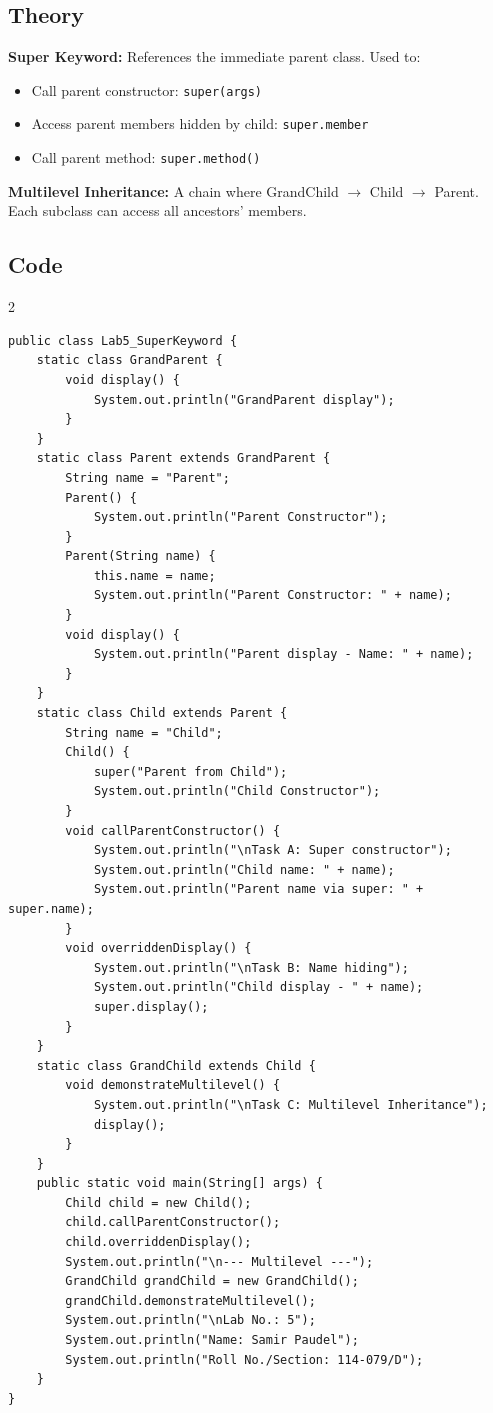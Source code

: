 \documentclass[10pt,a4paper]{article}
\begin{document}
\subsection*{Theory}
\textbf{Super Keyword:} References the immediate parent class. Used to:
\begin{itemize}[nosep]
    \item Call parent constructor: \texttt{super(args)}
    \item Access parent members hidden by child: \texttt{super.member}
    \item Call parent method: \texttt{super.method()}
\end{itemize}
\textbf{Multilevel Inheritance:} A chain where GrandChild $\rightarrow$ Child $\rightarrow$ Parent. Each subclass can access all ancestors' members.

\subsection*{Code}
\begin{multicols}{2}
\begin{lstlisting}
public class Lab5_SuperKeyword {
    static class GrandParent {
        void display() {
            System.out.println("GrandParent display");
        }
    }
    static class Parent extends GrandParent {
        String name = "Parent";
        Parent() {
            System.out.println("Parent Constructor");
        }
        Parent(String name) {
            this.name = name;
            System.out.println("Parent Constructor: " + name);
        }
        void display() {
            System.out.println("Parent display - Name: " + name);
        }
    }
    static class Child extends Parent {
        String name = "Child";
        Child() {
            super("Parent from Child");
            System.out.println("Child Constructor");
        }
        void callParentConstructor() {
            System.out.println("\nTask A: Super constructor");
            System.out.println("Child name: " + name);
            System.out.println("Parent name via super: " + super.name);
        }
        void overriddenDisplay() {
            System.out.println("\nTask B: Name hiding");
            System.out.println("Child display - " + name);
            super.display();
        }
    }
    static class GrandChild extends Child {
        void demonstrateMultilevel() {
            System.out.println("\nTask C: Multilevel Inheritance");
            display();
        }
    }
    public static void main(String[] args) {
        Child child = new Child();
        child.callParentConstructor();
        child.overriddenDisplay();
        System.out.println("\n--- Multilevel ---");
        GrandChild grandChild = new GrandChild();
        grandChild.demonstrateMultilevel();
        System.out.println("\nLab No.: 5");
        System.out.println("Name: Samir Paudel");
        System.out.println("Roll No./Section: 114-079/D");
    }
}
\end{lstlisting}
\end{multicols}
\end{document}
